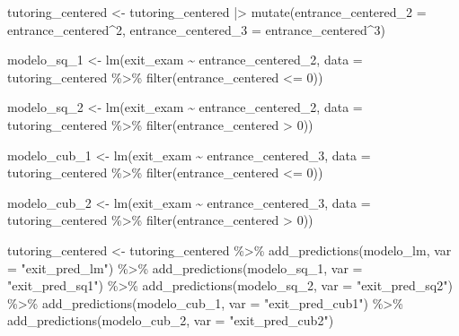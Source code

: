 \documentclass[
  letterpaper,
  DIV=11,
  numbers=noendperiod,
  oneside]{scrreprt}
\newenvironment{Shaded}{\begin{snugshade}}{\end{snugshade}}
\newcommand{\AttributeTok}[1]{\textcolor[rgb]{0.40,0.45,0.13}{#1}}
\newcommand{\DecValTok}[1]{\textcolor[rgb]{0.68,0.00,0.00}{#1}}
\newcommand{\FunctionTok}[1]{\textcolor[rgb]{0.28,0.35,0.67}{#1}}
\newcommand{\NormalTok}[1]{\textcolor[rgb]{0.00,0.23,0.31}{#1}}
\newcommand{\OtherTok}[1]{\textcolor[rgb]{0.00,0.23,0.31}{#1}}
\newcommand{\SpecialCharTok}[1]{\textcolor[rgb]{0.37,0.37,0.37}{#1}}
\newcommand{\StringTok}[1]{\textcolor[rgb]{0.13,0.47,0.30}{#1}}
\begin{document}
\begin{Shaded}
\begin{Highlighting}[]
\NormalTok{tutoring\_centered }\OtherTok{\textless{}{-}}\NormalTok{ tutoring\_centered }\SpecialCharTok{|\textgreater{}} 
  \FunctionTok{mutate}\NormalTok{(}\AttributeTok{entrance\_centered\_2 =}\NormalTok{ entrance\_centered}\SpecialCharTok{\^{}}\DecValTok{2}\NormalTok{,}
         \AttributeTok{entrance\_centered\_3 =}\NormalTok{ entrance\_centered}\SpecialCharTok{\^{}}\DecValTok{3}\NormalTok{)}

\NormalTok{modelo\_sq\_1 }\OtherTok{\textless{}{-}} \FunctionTok{lm}\NormalTok{(exit\_exam }\SpecialCharTok{\textasciitilde{}}\NormalTok{ entrance\_centered\_2, }
                  \AttributeTok{data =}\NormalTok{ tutoring\_centered }\SpecialCharTok{\%\textgreater{}\%}
                    \FunctionTok{filter}\NormalTok{(entrance\_centered }\SpecialCharTok{\textless{}=} \DecValTok{0}\NormalTok{))}

\NormalTok{modelo\_sq\_2 }\OtherTok{\textless{}{-}} \FunctionTok{lm}\NormalTok{(exit\_exam }\SpecialCharTok{\textasciitilde{}}\NormalTok{ entrance\_centered\_2,}
                  \AttributeTok{data =}\NormalTok{ tutoring\_centered }\SpecialCharTok{\%\textgreater{}\%}
                    \FunctionTok{filter}\NormalTok{(entrance\_centered }\SpecialCharTok{\textgreater{}} \DecValTok{0}\NormalTok{))}

\NormalTok{modelo\_cub\_1 }\OtherTok{\textless{}{-}} \FunctionTok{lm}\NormalTok{(exit\_exam }\SpecialCharTok{\textasciitilde{}}\NormalTok{ entrance\_centered\_3, }
                  \AttributeTok{data =}\NormalTok{ tutoring\_centered }\SpecialCharTok{\%\textgreater{}\%}
                    \FunctionTok{filter}\NormalTok{(entrance\_centered }\SpecialCharTok{\textless{}=} \DecValTok{0}\NormalTok{))}

\NormalTok{modelo\_cub\_2 }\OtherTok{\textless{}{-}} \FunctionTok{lm}\NormalTok{(exit\_exam }\SpecialCharTok{\textasciitilde{}}\NormalTok{ entrance\_centered\_3,}
                  \AttributeTok{data =}\NormalTok{ tutoring\_centered }\SpecialCharTok{\%\textgreater{}\%}
                    \FunctionTok{filter}\NormalTok{(entrance\_centered }\SpecialCharTok{\textgreater{}} \DecValTok{0}\NormalTok{))}

\NormalTok{tutoring\_centered }\OtherTok{\textless{}{-}}\NormalTok{ tutoring\_centered }\SpecialCharTok{\%\textgreater{}\%}
  \FunctionTok{add\_predictions}\NormalTok{(modelo\_lm, }\AttributeTok{var =} \StringTok{"exit\_pred\_lm"}\NormalTok{) }\SpecialCharTok{\%\textgreater{}\%}
  \FunctionTok{add\_predictions}\NormalTok{(modelo\_sq\_1, }\AttributeTok{var =} \StringTok{"exit\_pred\_sq1"}\NormalTok{) }\SpecialCharTok{\%\textgreater{}\%}
  \FunctionTok{add\_predictions}\NormalTok{(modelo\_sq\_2, }\AttributeTok{var =} \StringTok{"exit\_pred\_sq2"}\NormalTok{) }\SpecialCharTok{\%\textgreater{}\%}
  \FunctionTok{add\_predictions}\NormalTok{(modelo\_cub\_1, }\AttributeTok{var =} \StringTok{"exit\_pred\_cub1"}\NormalTok{) }\SpecialCharTok{\%\textgreater{}\%}
  \FunctionTok{add\_predictions}\NormalTok{(modelo\_cub\_2, }\AttributeTok{var =} \StringTok{"exit\_pred\_cub2"}\NormalTok{)}


\end{Highlighting}
\end{Shaded}
\end{document}
